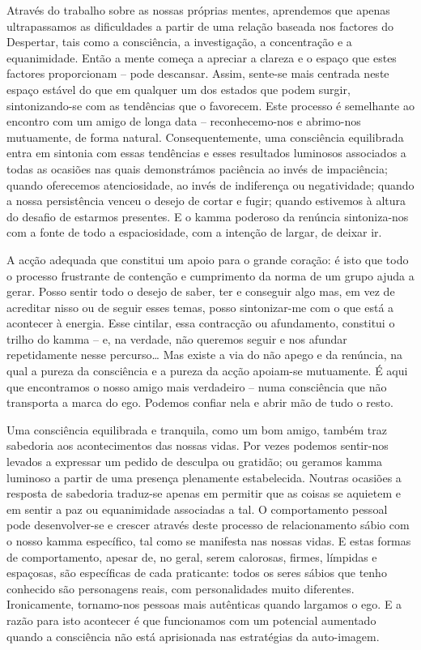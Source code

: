 Através do trabalho sobre as nossas próprias mentes, aprendemos que apenas ultrapassamos as dificuldades a partir de uma relação baseada nos factores do Despertar, tais como a consciência, a investigação, a concentração e a equanimidade. Então a mente começa a apreciar a clareza e o espaço que estes factores proporcionam -- pode descansar. Assim, sente-se mais centrada neste espaço estável do que em qualquer um dos estados que podem surgir, sintonizando-se com as tendências que o favorecem. Este processo é semelhante ao encontro com um amigo de longa data -- reconhecemo-nos e abrimo-nos mutuamente, de forma natural. Consequentemente, uma consciência equilibrada entra em sintonia com essas tendências e esses resultados luminosos associados a todas as ocasiões nas quais demonstrámos paciência ao invés de impaciência; quando oferecemos atenciosidade, ao invés de indiferença ou negatividade; quando a nossa persistência venceu o desejo de cortar e fugir; quando estivemos à altura do desafio de estarmos presentes. E o kamma poderoso da renúncia sintoniza-nos com a fonte de todo a espaciosidade, com a intenção de largar, de deixar ir.

A acção adequada que constitui um apoio para o grande coração: é isto que todo o processo frustrante de contenção e cumprimento da norma de um grupo ajuda a gerar. Posso sentir todo o desejo de saber, ter e conseguir algo mas, em vez de acreditar nisso ou de seguir esses temas, posso sintonizar-me com o que está a acontecer à energia. Esse cintilar, essa contracção ou afundamento, constitui o trilho do kamma -- e, na verdade, não queremos seguir e nos afundar repetidamente nesse percurso\ldots{} Mas existe a via do não apego e da renúncia, na qual a pureza da consciência e a pureza da acção apoiam-se mutuamente. É aqui que encontramos o nosso amigo mais verdadeiro -- numa consciência que não transporta a marca do ego. Podemos confiar nela e abrir mão de tudo o resto.

Uma consciência equilibrada e tranquila, como um bom amigo, também traz sabedoria aos acontecimentos das nossas vidas. Por vezes podemos sentir-nos levados a expressar um pedido de desculpa ou gratidão; ou geramos kamma luminoso a partir de uma presença plenamente estabelecida. Noutras ocasiões a resposta de sabedoria traduz-se apenas em permitir que as coisas se aquietem e em sentir a paz ou equanimidade associadas a tal. O comportamento pessoal pode desenvolver-se e crescer através deste processo de relacionamento sábio com o nosso kamma específico, tal como se manifesta nas nossas vidas. E estas formas de comportamento, apesar de, no geral, serem calorosas, firmes, límpidas e espaçosas, são específicas de cada praticante: todos os seres sábios que tenho conhecido são personagens reais, com personalidades muito diferentes. Ironicamente, tornamo-nos pessoas mais autênticas quando largamos o ego. E a razão para isto acontecer é que funcionamos com um potencial aumentado quando a consciência não está aprisionada nas estratégias da auto-imagem.
